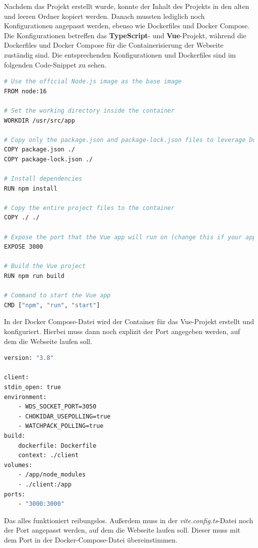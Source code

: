 Nachdem das Projekt erstellt wurde, konnte der Inhalt des Projekts in den alten und leeren Ordner kopiert werden. Danach mussten lediglich noch Konfigurationen angepasst werden, ebenso wie Dockerfiles und Docker Compose. Die Konfigurationen betreffen das \textbf{TypeScript}- und \textbf{Vue}-Projekt, während die Dockerfiles und Docker Compose für die Containerisierung der Webseite zuständig sind. Die entsprechenden Konfigurationen und Dockerfiles sind im folgenden Code-Snippet zu sehen.

\begin{lstlisting}[language={bash}, caption={Dockerfile für das Vue Projekt}]
# Use the official Node.js image as the base image
FROM node:16

# Set the working directory inside the container
WORKDIR /usr/src/app

# Copy only the package.json and package-lock.json files to leverage Docker cache
COPY package.json ./
COPY package-lock.json ./

# Install dependencies
RUN npm install

# Copy the entire project files to the container
COPY ./ ./

# Expose the port that the Vue app will run on (change this if your app uses a different port)
EXPOSE 3000

# Build the Vue project
RUN npm run build

# Command to start the Vue app
CMD ["npm", "run", "start"]
\end{lstlisting}

In der Docker Compose-Datei wird der Container für das Vue-Projekt erstellt und konfiguriert. Hierbei muss dann noch explizit der Port angegeben werden, auf dem die Webseite laufen soll.

\begin{lstlisting}[language={bash}, caption={Docker Compose für das Vue Projekt}]
version: "3.8"

client:
stdin_open: true
environment:
    - WDS_SOCKET_PORT=3050
    - CHOKIDAR_USEPOLLING=true
    - WATCHPACK_POLLING=true
build:
    dockerfile: Dockerfile
    context: ./client
volumes:
    - /app/node_modules
    - ./client:/app
ports:
    - "3000:3000"
\end{lstlisting}

Das alles funktioniert reibungslos. Außerdem muss in der \textit{vite.config.ts}-Datei noch der Port angepasst werden, auf dem die Webseite laufen soll. Dieser muss mit dem Port in der Docker-Compose-Datei übereinstimmen.

